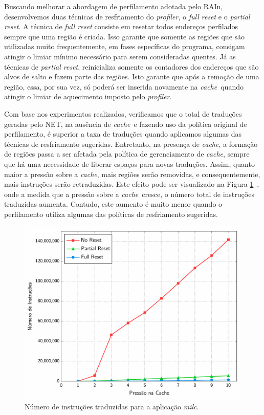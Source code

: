 \documentclass[12pt,twoside]{article}
\newcommand{\cache}{\emph{cache}}
\begin{document}
Buscando melhorar a abordagem de perfilamento adotada pelo RAIn, desenvolvemos duas técnicas de resfriamento do \emph{profiler}, o \emph{full reset} e o \emph{partial reset}. A técnica de \emph{full reset} consiste em resetar todos endereços perfilados sempre que uma região é criada. Isso garante que somente as regiões que são utilizadas muito frequentemente, em fases específicas do programa, consigam atingir o limiar mínimo necessário para serem consideradas quentes. Já as técnicas de \emph{partial reset}, reinicializa somente os contadores dos endereços que são alvos de salto e fazem parte das regiões. Isto garante que após a remoção de uma região, essa, por sua vez, só  poderá ser inserida novamente na \cache~quando atingir o limiar de aquecimento imposto pelo \emph{profiler}.

Com base nos experimentos realizados, verificamos que o total de traduções geradas pelo NET, na ausência de \cache~e fazendo uso da política original de perfilamento, é superior a taxa de traduções quando aplicamos algumas das técnicas de resfriamento sugeridas. Entretanto, na presença de \cache, a formação de regiões passa a ser afetada pela política de gerenciamento de \cache, sempre que há uma necessidade de liberar espaços para novas traduções. Assim, quanto maior a pressão sobre a \cache, mais regiões serão removidas, e consequentemente, mais instruções serão retraduzidas. Este efeito pode ser visualizado na Figura \ref{fig-milc-trans-freq}~, onde a medida que a pressão sobre a \cache~cresce, o número total de instruções traduzidas aumenta. Contudo, este aumento é muito menor quando o perfilamento utiliza algumas das políticas de resfriamento sugeridas.

\begin{figure}[!ht]
\centering
\includegraphics[scale=0.4]{./figs/reset-translate-inst}
\caption{Número de instruções traduzidas para a aplicação \emph{milc}.}
\label{fig-milc-trans-freq}
\end{figure}
\end{document}
